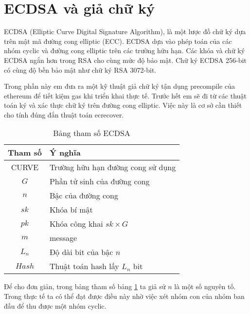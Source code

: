 \documentclass[../main.tex]{subfiles}
\begin{document}

\section{ECDSA và giả chữ ký}
 ECDSA (Elliptic Curve Digital Signature Algorithm), là một lược đồ chữ ký dựa trên mật mã đường cong elliptic (ECC). ECDSA dựa vào phép toán của các nhóm cyclic và đường cong elliptic trên các trường hữu hạn. Các khóa và chữ ký ECDSA ngắn hơn trong RSA cho cùng mức độ bảo mật. Chữ ký ECDSA 256-bit có cùng độ bền bảo mật như chữ ký RSA 3072-bit.

Trong phần này em đưa ra một kỹ thuật giả chữ ký tận dụng precompile của ethereum để tiết kiệm gas khi triển khai thực tế. Trước hết em sẽ đi từ các thuật toán ký và xác thực chữ ký trên đường cong elliptic. Việc này là cơ sở cần thiết cho tính đúng đắn thuật toán ecrecover.


\begin{table}[h!]
    \centering
    \begin{tabular}{||c l||}
    \hline
    Tham số       & Ý nghĩa   \\
    \hline \hline
    CURVE       & Trường hữu hạn đường cong sử dụng \\
    $G$         & Phần tử sinh của đường cong \\
    $n$         & Bậc của đường cong \\
    $sk$        & Khóa bí mật \\
    $pk$        & Khóa công khai $sk\times G$\\
    $m$         & message\\
    $L_n$       & Độ dài bit của bậc $n$\\
    $Hash$      & Thuật toán hash lấy $L_n$ bit\\
    \hline
    \end{tabular}
    \caption{Bảng tham số ECDSA}
    \label{table:ECDSA_params}
\end{table}

Để cho đơn giản, trong bảng tham số bảng \ref{table:ECDSA_params} ta giả sử $n$ là một số nguyên tố. Trong thực tế ta có thể đạt được điều này nhờ việc xét nhóm con của nhóm ban đầu để thu được một nhóm cyclic.
\end{document}
